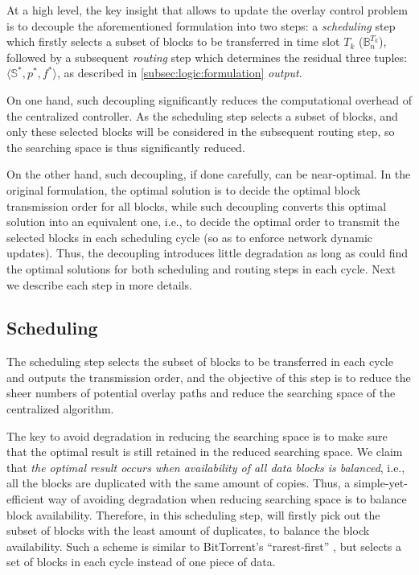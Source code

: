At a high level, the key insight that allows \name to update the overlay control problem is
to decouple the aforementioned formulation into two steps:
a {\em scheduling} step which firstly selects a subset of blocks to be transferred in time slot $T_k$
($\mathbb{B}^{T_k}_n$), followed by a subsequent {\em routing}
step which determines the residual three tuples: $\langle \mathbb{S}^*, p^*, f^* \rangle$, as described in \Section\ref{subsec:logic:formulation} {\em output}.

On one hand, such decoupling significantly reduces the computational overhead of the centralized controller. As the scheduling step selects a subset of blocks, and only these selected blocks will be considered in the subsequent routing step, so the searching space is thus significantly reduced.

On the other hand, such decoupling, if done carefully, can be near-optimal. In the original formulation, the optimal solution is to decide the optimal block transmission order for all blocks, while such decoupling converts this optimal solution into an equivalent one, i.e., to decide the optimal order to transmit the selected blocks in each scheduling cycle (so as to enforce network dynamic updates). Thus, the decoupling introduces little degradation as long as \name could find the optimal solutions for both scheduling and routing steps in each cycle. Next we describe each step in more details.


\subsection{Scheduling}
\label{subsec:logic:scheduling}

The scheduling step
selects the subset of blocks to be transferred in each cycle and
outputs the transmission order, and the objective of this step is to reduce the sheer numbers of potential overlay paths and reduce the searching space of the centralized algorithm.


The key to avoid degradation in reducing the searching space is to make sure that the optimal result is still retained in the reduced searching space. We claim that {\em the optimal result occurs when availability of all data blocks is balanced}, i.e., all the blocks are duplicated with the same amount of copies. Thus, a simple-yet-efficient way of avoiding degradation when reducing searching space is to balance block availability. Therefore, in this scheduling step, \name will firstly pick out the subset of blocks with the least amount of duplicates, to balance the block availability. Such a scheme is similar to BitTorrent's ``rarest-first'' \cite{Cohen2003Incentives}, but \name selects a set of blocks in each cycle instead of one piece of data.


